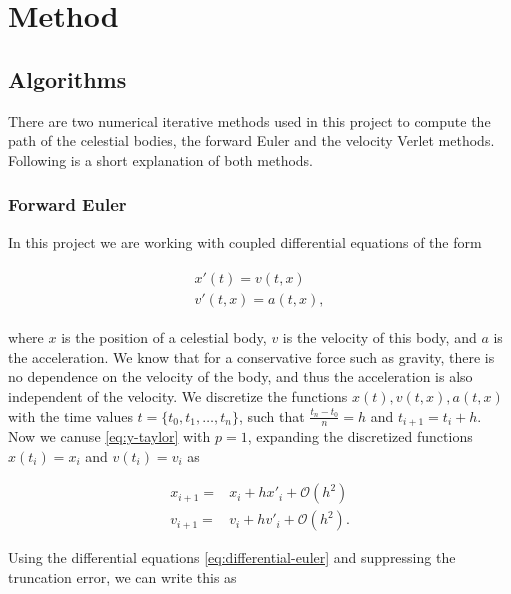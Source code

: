\documentclass[../main.tex]{subfiles}
\begin{document}
\section{Method}\label{sec:method}
\iffalse
\subsection{Units}
The astronomical unit (AU)
\fi

\subsection{Algorithms}

There are two numerical iterative methods used in this project to compute the path of the celestial bodies, the forward Euler and the velocity Verlet methods. Following is a short explanation of both methods.

\subsubsection{Forward Euler}
\label{sec:euler}

In this project we are working with coupled differential equations of the form

\begin{align}
    \begin{split}
        x'(t) = v(t,x)\\
        v'(t,x) = a(t,x),
    \end{split}
    \label{eq:differential-euler}
\end{align}

where $x$ is the position of a celestial body, $v$ is the velocity of this body, and $a$ is the acceleration. We know that for a conservative force such as gravity, there is no dependence on the velocity of the body, and thus the acceleration is also independent of the velocity. We discretize the functions $x(t), v(t,x), a(t,x)$ with the time values $t = \{t_0, t_1, \ldots , t_n\}$, such that $\frac{t_n - t_0}{n} = h$ and $t_{i+1} = t_i + h$. Now we canuse \cref{eq:y-taylor} with $p = 1$, expanding the discretized functions $x(t_i) = x_i$ and $v(t_i) = v_i$ as

\begin{align*}
    x_{i+1} = & x_i + h x'_i + \mathcal{O}(h^2) \\
    v_{i+1} = & v_i + h v'_i + \mathcal{O}(h^2).
\end{align*}

Using the differential equations \cref{eq:differential-euler} and suppressing the truncation error, we can write this as
\end{document}
